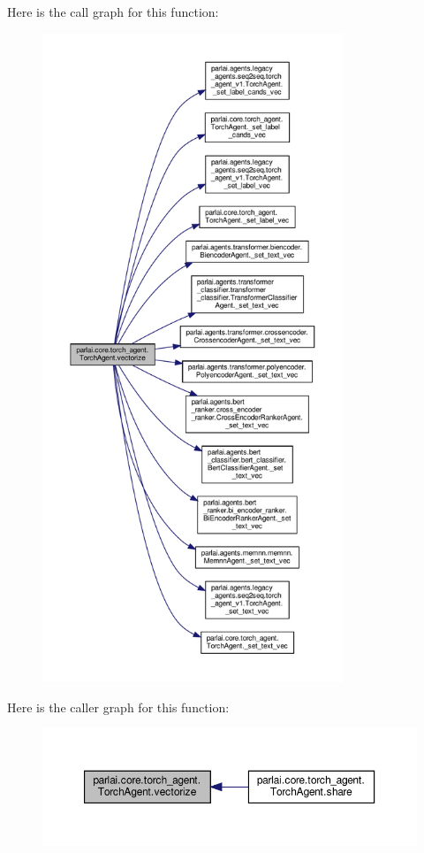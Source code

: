 Here is the call graph for this function\+:
\nopagebreak
\begin{figure}[H]
\begin{center}
\leavevmode
\includegraphics[height=550pt]{classparlai_1_1core_1_1torch__agent_1_1TorchAgent_a48bb9b153353a0565ab7253dc1daef99_cgraph}
\end{center}
\end{figure}
Here is the caller graph for this function\+:
\nopagebreak
\begin{figure}[H]
\begin{center}
\leavevmode
\includegraphics[width=350pt]{classparlai_1_1core_1_1torch__agent_1_1TorchAgent_a48bb9b153353a0565ab7253dc1daef99_icgraph}
\end{center}
\end{figure}
